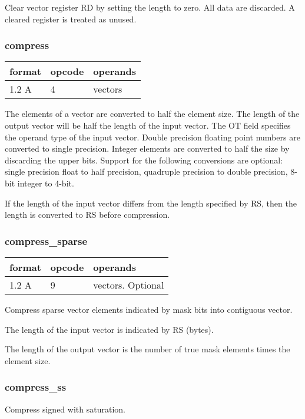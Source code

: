 \documentclass[forwardcom.tex]{subfiles}
\begin{document}
Clear vector register RD by setting the length to zero. All data are discarded. A cleared register is treated as unused. 

\subsubsection{compress}
\label{table:compressInstruction}
\begin{tabular}{|p{12mm}|p{12mm}|p{110mm}|}
\hline
\bfseries format & \bfseries opcode & \bfseries operands \\ \hline
1.2 A & 4 & vectors \\ \hline
\end{tabular}
\vspace{2mm}

The elements of a vector are converted to half the element size. The length of the output vector will be half the length of the input vector. The OT field specifies the operand type of the input vector. Double precision floating point numbers are converted to single precision. Integer elements are converted to half the size by discarding the upper bits. Support for the following conversions are optional: single precision float to half precision, quadruple precision to double precision, 8-bit integer to 4-bit.
\vspace{2mm}

If the length of the input vector differs from the length specified by RS, then the length is converted to RS before compression.

\subsubsection{compress\_sparse}
\label{table:compressSparseInstruction}
\begin{tabular}{|p{12mm}|p{12mm}|p{110mm}|}
\hline
\bfseries format & \bfseries opcode & \bfseries operands \\ \hline
1.2 A & 9 & vectors. Optional \\ \hline
\end{tabular}
\vspace{2mm}

Compress sparse vector elements indicated by mask bits into contiguous vector. 

The length of the input vector is indicated by RS (bytes).

The length of the output vector is the number of true mask elements
times the element size.

\subsubsection{compress\_ss}
Compress signed with saturation.
\end{document}
